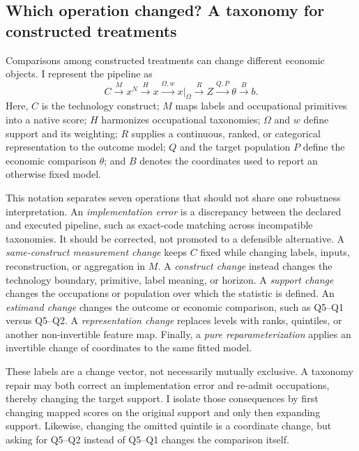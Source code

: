 
\subsection{Which operation changed? A taxonomy for constructed treatments}
\label{sec:operation-taxonomy}

Comparisons among constructed treatments can change different economic
objects.  I represent the pipeline as
\[
C\xrightarrow{M}x^N\xrightarrow{H}x
 \xrightarrow{\Omega,w}x|_{\Omega}\xrightarrow{R}Z
 \xrightarrow{Q,P}\theta\xrightarrow{B}b .
\]
Here, $C$ is the technology construct; $M$ maps labels and occupational
primitives into a native score; $H$ harmonizes occupational taxonomies;
$\Omega$ and $w$ define support and its weighting; $R$ supplies a continuous,
ranked, or categorical representation to the outcome model; $Q$ and the target
population $P$ define the economic comparison $\theta$; and $B$ denotes the
coordinates used to report an otherwise fixed model.

This notation separates seven operations that should not share one robustness
interpretation.  An \emph{implementation error} is a discrepancy between the
declared and executed pipeline, such as exact-code matching across incompatible
taxonomies.  It should be corrected, not promoted to a defensible alternative.
A \emph{same-construct measurement change} keeps $C$ fixed while changing
labels, inputs, reconstruction, or aggregation in $M$.  A \emph{construct
change} instead changes the technology boundary, primitive, label meaning, or
horizon.  A \emph{support change} changes the occupations or population over
which the statistic is defined.  An \emph{estimand change} changes the outcome
or economic comparison, such as Q5--Q1 versus Q5--Q2.  A \emph{representation
change} replaces levels with ranks, quintiles, or another non-invertible feature
map.  Finally, a \emph{pure reparameterization} applies an invertible change of
coordinates to the same fitted model.

These labels are a change vector, not necessarily mutually exclusive.  A
taxonomy repair may both correct an implementation error and re-admit
occupations, thereby changing the target support.  I isolate those consequences
by first changing mapped scores on the original support and only then expanding
support.  Likewise, changing the omitted quintile is a coordinate change, but
asking for Q5--Q2 instead of Q5--Q1 changes the comparison itself.

